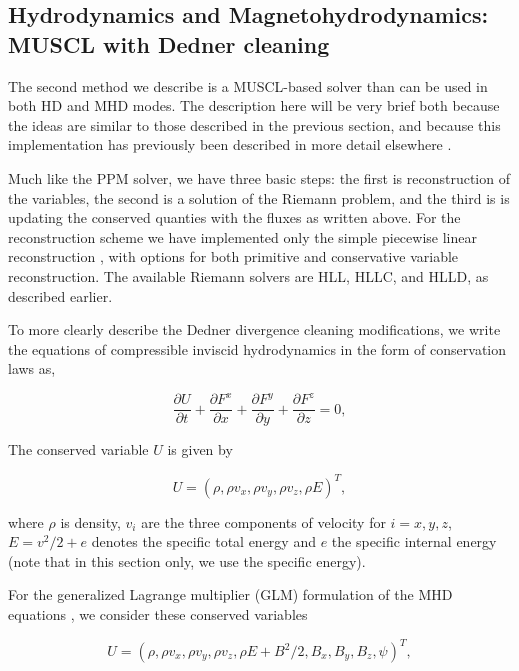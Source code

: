 \subsection{Hydrodynamics and Magnetohydrodynamics: MUSCL with Dedner cleaning}
\label{sec.num.hydro-muscl}

The second method we describe is a MUSCL-based solver than can be used
in both HD and MHD modes.  The description here will be very brief
both because the ideas are similar to those described in the previous
section, and because this implementation has previously been described
in more detail elsewhere \citep{WangAbelZhang08, WangAbel09}.

Much like the PPM solver, we have three basic steps: the first is reconstruction of the variables, the second is a solution of the Riemann problem, and the third is is updating the conserved quanties with the fluxes as written above. For the reconstruction scheme we have implemented only the simple piecewise linear reconstruction \citep{1979JCoPh..32..101V, 1985JCoPh..59..264C}, with options for both primitive and conservative variable reconstruction. The available Riemann solvers are HLL, HLLC, and HLLD, as described earlier.

To more clearly describe the Dedner divergence cleaning modifications,
we write the equations of compressible inviscid hydrodynamics in the
form of conservation laws as,

\begin{equation}
 \frac{\partial{U}}{\partial{t}} +
 \frac{\partial{F^x}}{\partial{x}} + \frac{\partial{F^y}}{\partial{y}} + \frac{\partial{F^z}}{\partial{z}}= 0, \label{hydro}
\end{equation}

The conserved variable $U$ is given by

\begin{equation}
 U = (\rho, \rho v_x, \rho v_y, \rho v_z, \rho E)^{T},
\end{equation} 

where $\rho$ is density, $v_i$ are the three components of velocity
for $i={x,y,z}$, $E=v^2/2 + e$ denotes the specific total energy and $e$ the
specific internal energy (note that in this section only, we use the specific
energy).

For the generalized Lagrange multiplier (GLM) formulation of the MHD
equations \citep{2002JCoPh.175..645D}, we consider these 
conserved variables

\begin{equation}
 U = (\rho, \rho v_x, \rho v_y, \rho v_z, \rho E+B^2/2, B_x, B_y, B_z, \psi)^{T},
\end{equation} 

